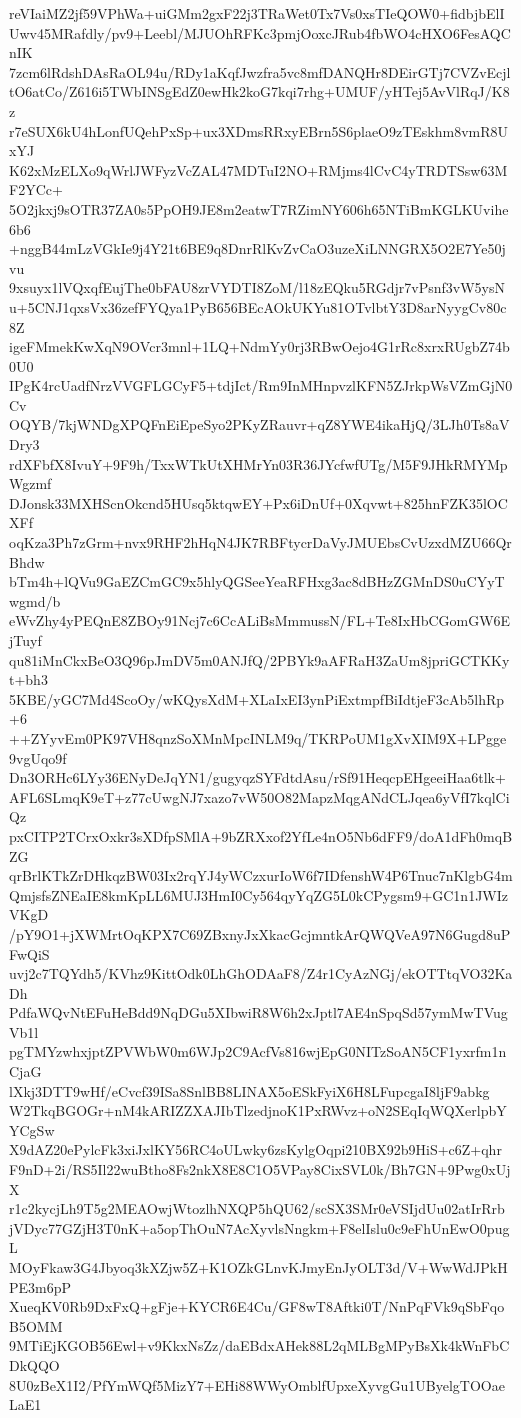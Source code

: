 reVIaiMZ2jf59VPhWa+uiGMm2gxF22j3TRaWet0Tx7Vs0xsTIeQOW0+fidbjbElI
Uwv45MRafdly/pv9+Leebl/MJUOhRFKc3pmjOoxcJRub4fbWO4cHXO6FesAQCnIK
7zcm6lRdshDAsRaOL94u/RDy1aKqfJwzfra5vc8mfDANQHr8DEirGTj7CVZvEcjl
tO6atCo/Z616i5TWbINSgEdZ0ewHk2koG7kqi7rhg+UMUF/yHTej5AvVlRqJ/K8z
r7eSUX6kU4hLonfUQehPxSp+ux3XDmsRRxyEBrn5S6plaeO9zTEskhm8vmR8UxYJ
K62xMzELXo9qWrlJWFyzVcZAL47MDTuI2NO+RMjms4lCvC4yTRDTSsw63MF2YCc+
5O2jkxj9sOTR37ZA0s5PpOH9JE8m2eatwT7RZimNY606h65NTiBmKGLKUvihe6b6
+nggB44mLzVGkIe9j4Y21t6BE9q8DnrRlKvZvCaO3uzeXiLNNGRX5O2E7Ye50jvu
9xsuyx1lVQxqfEujThe0bFAU8zrVYDTI8ZoM/l18zEQku5RGdjr7vPsnf3vW5ysN
u+5CNJ1qxsVx36zefFYQya1PyB656BEcAOkUKYu81OTvlbtY3D8arNyygCv80c8Z
igeFMmekKwXqN9OVcr3mnl+1LQ+NdmYy0rj3RBwOejo4G1rRc8xrxRUgbZ74b0U0
IPgK4rcUadfNrzVVGFLGCyF5+tdjIct/Rm9InMHnpvzlKFN5ZJrkpWsVZmGjN0Cv
OQYB/7kjWNDgXPQFnEiEpeSyo2PKyZRauvr+qZ8YWE4ikaHjQ/3LJh0Ts8aVDry3
rdXFbfX8IvuY+9F9h/TxxWTkUtXHMrYn03R36JYcfwfUTg/M5F9JHkRMYMpWgzmf
DJonsk33MXHScnOkcnd5HUsq5ktqwEY+Px6iDnUf+0Xqvwt+825hnFZK35lOCXFf
oqKza3Ph7zGrm+nvx9RHF2hHqN4JK7RBFtycrDaVyJMUEbsCvUzxdMZU66QrBhdw
bTm4h+lQVu9GaEZCmGC9x5hlyQGSeeYeaRFHxg3ac8dBHzZGMnDS0uCYyTwgmd/b
eWvZhy4yPEQnE8ZBOy91Ncj7c6CcALiBsMmmussN/FL+Te8IxHbCGomGW6EjTuyf
qu81iMnCkxBeO3Q96pJmDV5m0ANJfQ/2PBYk9aAFRaH3ZaUm8jpriGCTKKyt+bh3
5KBE/yGC7Md4ScoOy/wKQysXdM+XLaIxEI3ynPiExtmpfBiIdtjeF3cAb5lhRp+6
++ZYyvEm0PK97VH8qnzSoXMnMpcINLM9q/TKRPoUM1gXvXIM9X+LPgge9vgUqo9f
Dn3ORHc6LYy36ENyDeJqYN1/gugyqzSYFdtdAsu/rSf91HeqcpEHgeeiHaa6tlk+
AFL6SLmqK9eT+z77cUwgNJ7xazo7vW50O82MapzMqgANdCLJqea6yVfI7kqlCiQz
pxCITP2TCrxOxkr3sXDfpSMlA+9bZRXxof2YfLe4nO5Nb6dFF9/doA1dFh0mqBZG
qrBrlKTkZrDHkqzBW03Ix2rqYJ4yWCzxurIoW6f7IDfenshW4P6Tnuc7nKlgbG4m
QmjsfsZNEaIE8kmKpLL6MUJ3HmI0Cy564qyYqZG5L0kCPygsm9+GC1n1JWIzVKgD
/pY9O1+jXWMrtOqKPX7C69ZBxnyJxXkacGcjmntkArQWQVeA97N6Gugd8uPFwQiS
uvj2c7TQYdh5/KVhz9KittOdk0LhGhODAaF8/Z4r1CyAzNGj/ekOTTtqVO32KaDh
PdfaWQvNtEFuHeBdd9NqDGu5XIbwiR8W6h2xJptl7AE4nSpqSd57ymMwTVugVb1l
pgTMYzwhxjptZPVWbW0m6WJp2C9AcfVs816wjEpG0NITzSoAN5CF1yxrfm1nCjaG
lXkj3DTT9wHf/eCvcf39ISa8SnlBB8LINAX5oESkFyiX6H8LFupcgaI8ljF9abkg
W2TkqBGOGr+nM4kARIZZXAJIbTlzedjnoK1PxRWvz+oN2SEqIqWQXerlpbYYCgSw
X9dAZ20ePylcFk3xiJxlKY56RC4oULwky6zsKylgOqpi210BX92b9HiS+c6Z+qhr
F9nD+2i/RS5Il22wuBtho8Fs2nkX8E8C1O5VPay8CixSVL0k/Bh7GN+9Pwg0xUjX
r1c2kycjLh9T5g2MEAOwjWtozlhNXQP5hQU62/scSX3SMr0eVSIjdUu02atIrRrb
jVDyc77GZjH3T0nK+a5opThOuN7AcXyvlsNngkm+F8elIslu0c9eFhUnEwO0pugL
MOyFkaw3G4Jbyoq3kXZjw5Z+K1OZkGLnvKJmyEnJyOLT3d/V+WwWdJPkHPE3m6pP
XueqKV0Rb9DxFxQ+gFje+KYCR6E4Cu/GF8wT8Aftki0T/NnPqFVk9qSbFqoB5OMM
9MTiEjKGOB56Ewl+v9KkxNsZz/daEBdxAHek88L2qMLBgMPyBsXk4kWnFbCDkQQO
8U0zBeX1I2/PfYmWQf5MizY7+EHi88WWyOmblfUpxeXyvgGu1UByelgTOOaeLaE1
